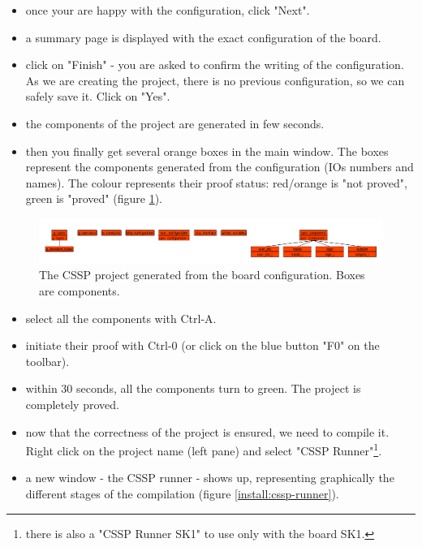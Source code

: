 \begin{itemize}
    \item once your are happy with the configuration, click "Next".
    \item a summary page is displayed with the exact configuration of the board.
    \item click on "Finish" - you are asked to confirm the writing of the configuration. As we are creating the project, there is no previous configuration, so we can safely save it. Click on "Yes".
    \item the components of the project are generated in few seconds.
    \item then you finally get several orange boxes in the main window. The boxes represent the components generated from the configuration (IOs numbers and names). The colour represents their proof status: red/orange is "not proved", green is "proved" (figure \ref{install:project-components}).
 \end{itemize}
  
  \begin{figure}[h]
\centering\includegraphics[scale=0.28]{Pictures/chapterProgramming/FIRSTRUN-create-project-005.png}
\caption{The CSSP project generated from the board configuration. Boxes are components.}
\label{install:project-components}
\end{figure}  
    
\begin{itemize}   
    \item select all the components with Ctrl-A.
    \item initiate their proof with Ctrl-0 (or click on the blue button "F0" on the toolbar).
    \item within 30 seconds, all the components turn to green. The project is completely proved. 
    \item now that the correctness of the project is ensured, we need to compile it. Right click on the project name (left pane) and select "CSSP Runner"\footnote{there is also a "CSSP Runner SK1" to use only with the board SK1.}.
    \item a new window - the CSSP runner - shows up, representing graphically the different stages of the compilation (figure \ref{install:cssp-runner}).
\end{itemize}
  
